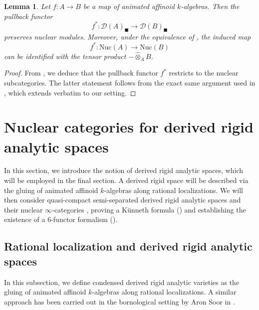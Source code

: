 \documentclass[oneside, hidelinks, 12pt, a4paper,reqno]{amsart}
\theoremstyle{plain}
\theoremstyle{definition}
\theoremstyle{plain}
\newtheorem{lemma}[lemma]{Lemma}
\newcommand{\cD}{\mathscr D}
\newcommand{\cates}{$\infty$-categories }
\newcommand{\Nuc}{\mathrm{Nuc}}
\newcommand{\Solid}{\blacksquare}
\begin{document}
\begin{lemma}\label{lem: pullback derived affinoids}
    Let $f \colon A \to B$ be a map of animated affinoid $k$-algebras. Then the pullback functor 
    \[
    f^{\ast} \colon \cD(A)_{\Solid} \to \cD(B)_{\Solid}
    \]
    preserves nuclear modules. Moreover, under the equivalence of , the induced map
    \[
    f^{\ast} \colon \Nuc(A) \to \Nuc(B)
    \]
    can be identified with the tensor product $-\widehat{\otimes}_{A} B$.
\end{lemma}
\begin{proof}
    From \cite[Theorem 2.9 (c)]{meyer2025qhodgecomplexesrefinedoperatornametc}, we deduce that the pullback functor $f^{\ast}$ restricts to the nuclear subcategories. The latter statement follows from the exact same argument used in \cite[Proposition 3.2.8]{montagnani2025axiomaticapproachanalytic1affineness}, which extends verbatim to our setting.
\end{proof}

\section{Nuclear categories for derived rigid analytic spaces}\label{Section 3}
In this section, we introduce the notion of derived rigid analytic spaces, which will be employed in the final section. A derived rigid space will be described via the gluing of animated affinoid $k$-algebras along rational localizations. We will then consider quasi-compact semi-separated derived rigid analytic spaces and their nuclear \cates, proving a K\"{u}nneth formula () and establishing the existence of a $6$-functor formalism (). 

\subsection{Rational localization and derived rigid analytic spaces}
In this subsection, we define condensed derived rigid analytic varieties as the gluing of animated affinoid $k$-algebras along rational localizations. A similar approach has been carried out in the bornological setting by Aron Soor in \cite{soor2025sixfunctorformalismquasicoherentsheaves}.
\end{document}
